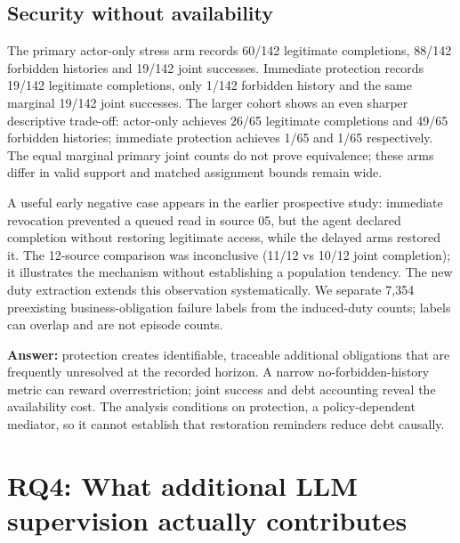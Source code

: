 \documentclass[10pt]{article}
\begin{document}
\subsection{Security without availability}
The primary actor-only stress arm records 60/142 legitimate completions, 88/142 forbidden histories and 19/142 joint successes. Immediate protection records 19/142 legitimate completions, only 1/142 forbidden history and the same marginal 19/142 joint successes. The larger cohort shows an even sharper descriptive trade-off: actor-only achieves 26/65 legitimate completions and 49/65 forbidden histories; immediate protection achieves 1/65 and 1/65 respectively. The equal marginal primary joint counts do not prove equivalence; these arms differ in valid support and matched assignment bounds remain wide.

A useful early negative case appears in the earlier prospective study: immediate revocation prevented a queued read in source 05, but the agent declared completion without restoring legitimate access, while the delayed arms restored it. The 12-source comparison was inconclusive (11/12 vs 10/12 joint completion); it illustrates the mechanism without establishing a population tendency. The new duty extraction extends this observation systematically. We separate 7,354 preexisting business-obligation failure labels from the induced-duty counts; labels can overlap and are not episode counts.

\textbf{Answer:} protection creates identifiable, traceable additional obligations that are frequently unresolved at the recorded horizon. A narrow no-forbidden-history metric can reward overrestriction; joint success and debt accounting reveal the availability cost. The analysis conditions on protection, a policy-dependent mediator, so it cannot establish that restoration reminders reduce debt causally.
\section{RQ4: What additional LLM supervision actually contributes}
\end{document}
